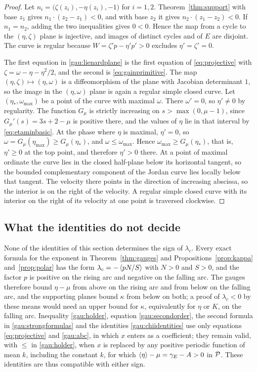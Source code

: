 \begin{proof}
Let $n_i=\bigl(\zeta(z_i),-\eta(z_i),-1\bigr)$ for $i=1,2$. Theorem~\ref{thm:support} with base $z_1$ gives $n_1\cdot(z_2-z_1)<0$, and with base $z_2$ it gives $n_2\cdot(z_1-z_2)<0$. If $n_1=n_2$, adding the two inequalities gives $0<0$. Hence the map from a cycle to the $(\eta,\zeta)$ plane is injective, and images of distinct cycles and of $E$ are disjoint. The curve is regular because $W=\zeta'p-\eta'p'>0$ excludes $\eta'=\zeta'=0$.

The first equation in \eqref{gau:lienardplane} is the first equation of \eqref{eq:projective} with $\zeta=\omega-\eta-\eta^2/2$, and the second is \eqref{eq:gainprimitive}. The map $(\eta,\zeta)\mapsto(\eta,\omega)$ is a diffeomorphism of the plane with Jacobian determinant $1$, so the image in the $(\eta,\omega)$ plane is again a regular simple closed curve. Let $(\eta_*,\omega_{\max})$ be a point of the curve with maximal $\omega$. There $\omega'=0$, so $\eta'\ne0$ by regularity. The function $G_\mu$ is strictly increasing on $s>\max(0,\mu-1)$, since $G_\mu'(s)=3s+2-\mu$ is positive there, and the values of $\eta$ lie in that interval by \eqref{eq:etaminbasic}. At the phase where $\eta$ is maximal, $\eta'=0$, so $\omega=G_\mu(\eta_{\max})\ge G_\mu(\eta_*)$, and $\omega\le\omega_{\max}$. Hence $\omega_{\max}\ge G_\mu(\eta_*)$, that is, $\eta'\ge0$ at the top point, and therefore $\eta'>0$ there. At a point of maximal ordinate the curve lies in the closed half-plane below its horizontal tangent, so the bounded complementary component of the Jordan curve lies locally below that tangent. The velocity there points in the direction of increasing abscissa, so the interior is on the right of the velocity. A regular simple closed curve with its interior on the right of its velocity at one point is traversed clockwise.
\end{proof}

\subsection{What the identities do not decide}
None of the identities of this section determines the sign of $\lambda_c$. Every exact formula for the exponent in Theorem~\ref{thm:gauges} and Propositions~\ref{prop:kappa} and~\ref{prop:polar} has the form $\lambda_c=-\left\langle pN/S\right\rangle$ with $N>0$ and $S>0$, and the factor $p$ is positive on the rising arc and negative on the falling arc. The gauges therefore bound $\eta-\mu$ from above on the rising arc and from below on the falling arc, and the supporting planes bound $\kappa$ from below on both; a proof of $\lambda_c<0$ by these means would need an upper bound for $\kappa$, equivalently for $\eta$ or $K$, on the falling arc. Inequality \eqref{gau:holder}, equation \eqref{gau:secondorder}, the second formula in \eqref{gau:strongformulas} and the identities \eqref{gau:chiidentities} use only equations \eqref{eq:projective} and \eqref{gau:abc}, in which $x$ enters as a coefficient; they remain valid, with $\le$ in \eqref{gau:holder}, when $x$ is replaced by any positive periodic function of mean $k$, including the constant $k$, for which $\left\langle \eta\right\rangle-\mu=\gamma_E-A>0$ in $\mathcal P$. These identities are thus compatible with either sign.
